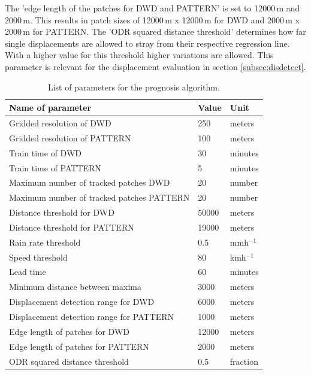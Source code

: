 \documentclass[11pt,twoside,a4paper,fleqn,x11names]{report}
\numberwithin{equation}{chapter}
\numberwithin{figure}{chapter}
\numberwithin{table}{chapter}
\begin{document}
The 'edge length of the patches for DWD and PATTERN' is set to 12000\,m and 2000\,m. This results in patch sizes of 12000\,m x 12000\,m for DWD and 2000\,m x 2000\,m for PATTERN. The 'ODR squared distance threshold' determines how far single displacements are allowed to stray from their respective regression line. With a higher value for this threshold higher variations are allowed. This parameter is relevant for the displacement evaluation in section \ref{subsec:disdetect}.
\begin{table}[ht]
	\centering
	\caption[]{List of parameters for the prognosis algorithm.}
	\label{tab:parameter}
	\begin{tabular}{|l|l|l|}
		\hline
		Name of parameter &Value & Unit\\\hline
		Gridded resolution of DWD & 250 & meters\\
		Gridded resolution of PATTERN & 100 & meters\\
		Train time of DWD & 30 & minutes\\
		Train time of PATTERN & 5 & minutes\\
		Maximum number of tracked patches DWD& 20 & number\\
		Maximum number of tracked patches PATTERN& 20 & number\\
		Distance threshold for DWD & 50000 & meters\\
		Distance threshold for PATTERN &  19000 & meters\\
		Rain rate threshold & 0.5 & mmh$^{-1}$ \\
		Speed threshold & 80 & kmh$^{-1}$  \\
		Lead time  & 60 & minutes \\
		Minimum distance between maxima & 3000 & meters \\
		Displacement detection range for DWD & 6000 & meters\\
		Displacement detection range for PATTERN & 1000 & meters\\
		Edge length of patches for DWD & 12000 & meters\\
		Edge length of patches for PATTERN & 2000 & meters\\
		ODR squared distance threshold & 0.5 & fraction \\\hline
	\end{tabular}
\end{table}
\FloatBarrier
\end{document}
